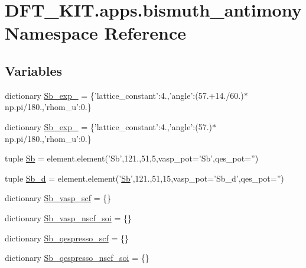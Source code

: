 \hypertarget{namespace_d_f_t___k_i_t_1_1apps_1_1bismuth__antimony}{\section{D\+F\+T\+\_\+\+K\+I\+T.\+apps.\+bismuth\+\_\+antimony Namespace Reference}
\label{namespace_d_f_t___k_i_t_1_1apps_1_1bismuth__antimony}
}
\subsection*{Variables}
\begin{DoxyCompactItemize}
\item 
dictionary \hyperlink{namespace_d_f_t___k_i_t_1_1apps_1_1bismuth__antimony_aa1abaca0360ca74cc7aff767b2f8b339}{Sb\+\_\+exp\+\_} = \{'lattice\+\_\+constant'\+:4.,'angle'\+:(57.+14./60.)$\ast$np.\+pi/180.,'rhom\+\_\+u'\+:0.\}
\item 
dictionary \hyperlink{namespace_d_f_t___k_i_t_1_1apps_1_1bismuth__antimony_a241f6ef77b95d1682e324b5c0e2ef2e9}{Sb\+\_\+exp\+\_} = \{'lattice\+\_\+constant'\+:4.,'angle'\+:(57.)$\ast$np.\+pi/180.,'rhom\+\_\+u'\+:0.\}
\item 
tuple \hyperlink{namespace_d_f_t___k_i_t_1_1apps_1_1bismuth__antimony_a93eb1699becde1ccbaea30f9f2a83c48}{Sb} = element.\+element('Sb',121.,51,5,vasp\+\_\+pot='Sb',qes\+\_\+pot='')
\item 
tuple \hyperlink{namespace_d_f_t___k_i_t_1_1apps_1_1bismuth__antimony_a98b6587f573c187c59bed3eb7ba473ec}{Sb\+\_\+d} = element.\+element('\hyperlink{namespace_d_f_t___k_i_t_1_1apps_1_1bismuth__antimony_a93eb1699becde1ccbaea30f9f2a83c48}{Sb}',121.,51,15,vasp\+\_\+pot='Sb\+\_\+d',qes\+\_\+pot='')
\item 
dictionary \hyperlink{namespace_d_f_t___k_i_t_1_1apps_1_1bismuth__antimony_ac29eda409a16938d88021a96729db286}{Sb\+\_\+vasp\+\_\+scf} = \{\}
\item 
dictionary \hyperlink{namespace_d_f_t___k_i_t_1_1apps_1_1bismuth__antimony_aaf0784cd6faa22be296849a9edac5b29}{Sb\+\_\+vasp\+\_\+nscf\+\_\+soi} = \{\}
\item 
dictionary \hyperlink{namespace_d_f_t___k_i_t_1_1apps_1_1bismuth__antimony_a0e0f7c4aa8d0742ba96eaa32092c4d38}{Sb\+\_\+qespresso\+\_\+scf} = \{\}
\item 
dictionary \hyperlink{namespace_d_f_t___k_i_t_1_1apps_1_1bismuth__antimony_a59fa5c238b4d21bbc0313b00f42bbfe9}{Sb\+\_\+qespresso\+\_\+nscf\+\_\+soi} = \{\}

\end{DoxyCompactItemize}

